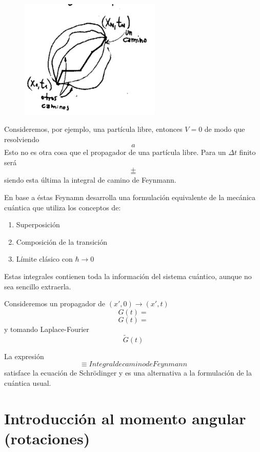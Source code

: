 \documentclass[10pt,oneside]{CBFT_book}
\begin{document}
\begin{figure}[htb]
	\begin{center}
	\includegraphics[width=0.6\textwidth]{images/teo2_9.pdf}
	\end{center}
	\caption{}
\end{figure} 

Consideremos, por ejemplo, una partícula libre, entonces $V=0$ de modo que resolviendo 
\[
	a
\]
Esto no es otra cosa que el propagador de una partícula libre. Para un $\Delta t$ finito será 
\[
	+
\]
\[
	=
\]
siendo esta última la integral de camino de Feynmann.

En base a éstas Feynamn desarrolla una formulación equivalente de la mecánica cuántica que utiliza los 
conceptos de:
\begin{enumerate}
 \item Superposición
 \item Composición de la transición
 \item Límite clásico con $\hbar \to 0$
\end{enumerate}

Estas integrales contienen toda la información del sistema cuántico, aunque no sea sencillo extraerla.

Consideremos un propagador de $(x',0) \to (x',t)$
\[
	G(t) =
\]
\[
	G(t) =
\]
y tomando Laplace-Fourier 
\[
	\tilde{G}(t)
\]

La expresión 
\[
	\equiv Integral de camino de Feynmann
\]
satisface la ecuación de Schrödinger y es una alternativa a la formulación de la cuántica usual.

\section{Introducción al momento angular (rotaciones)}
\end{document}
